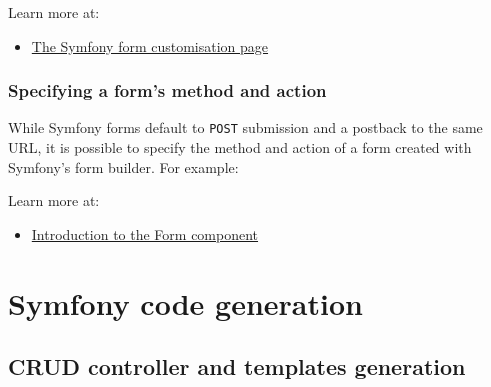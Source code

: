 \documentclass[a4paperpaper,openright]{book}
\newenvironment{Shaded}{}{}
\newcommand{\KeywordTok}[1]{\textcolor[rgb]{0.00,0.44,0.13}{\textbf{#1}}}
\newcommand{\NormalTok}[1]{#1}
\newcommand{\OtherTok}[1]{\textcolor[rgb]{0.00,0.44,0.13}{#1}}
\newcommand{\StringTok}[1]{\textcolor[rgb]{0.25,0.44,0.63}{#1}}
\providecommand{\tightlist}{%
  \setlength{\itemsep}{0pt}\setlength{\parskip}{0pt}}
\begin{document}
Learn more at:

\begin{itemize}
\tightlist
\item
  \href{https://symfony.com/doc/current/form/form_customization.html}{The
  Symfony form customisation page}
\end{itemize}

\hypertarget{specifying-a-forms-method-and-action}{%
\section{\texorpdfstring{Specifying a form's \textbf{method} and
\textbf{action}}{Specifying a form's method and action}}\label{specifying-a-forms-method-and-action}}

While Symfony forms default to \texttt{POST} submission and a postback
to the same URL, it is possible to specify the method and action of a
form created with Symfony's form builder. For example:

\begin{Shaded}
\end{Shaded}

Learn more at:

\begin{itemize}
\tightlist
\item
  \href{https://symfony.com/doc/current/components/form.html}{Introduction
  to the Form component}
\end{itemize}

\part{Symfony code generation}

\hypertarget{crud-controller-and-templates-generation}{%
\chapter{\texorpdfstring{CRUD controller and templates
generation\label{crud_gen_chapter}}{CRUD controller and templates generation}}\label{crud-controller-and-templates-generation}}
\end{document}
